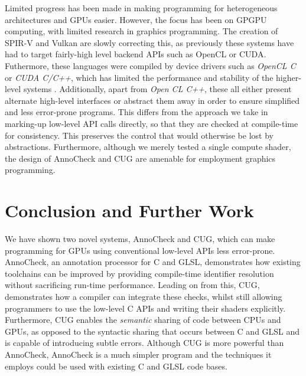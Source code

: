 \documentclass[a4paper,12pt,twoside,openright]{report}
\begin{document}
Limited progress has been made in making programming for heterogeneous
architectures and GPUs easier. However, the focus has been on GPGPU computing,
with limited research in graphics programming. The creation of SPIR-V and
Vulkan are slowly correcting this, as previously these systems have had to
target fairly-high level backend APIs such as OpenCL or CUDA. Futhermore, these
languages were compiled by device drivers such as \textit{OpenCL C} or
\textit{CUDA C/C++}, which has limited the performance and stability of the
higher-level systems \cite{GLFuzz}. Additionally, apart from \textit{Open CL
C++}, these all either present alternate high-level interfaces or abstract them
away in order to ensure simplified and less error-prone programs. This differs
from the approach we take in marking-up low-level API calls directly, so that
they are checked at compile-time for consistency. This preserves the control
that would otherwise be lost by abstractions. Furthermore, although we merely
tested a single compute shader, the design of AnnoCheck and CUG are amenable
for employment graphics programming.

\chapter{Conclusion and Further Work}

\label{chp:conclusion_and_further_work}



We have shown two novel systems, AnnoCheck and CUG, which can make programming
for GPUs using conventional low-level APIs less error-prone. AnnoCheck, an
annotation processor for C and GLSL, demonstrates how existing toolchains can
be improved by providing compile-time identifier resolution without sacrificing
run-time performance. Leading on from this, CUG, demonstrates how a compiler
can integrate these checks, whilst still allowing programmers to use the
low-level C APIs and writing their shaders explicitly. Furthermore, CUG enables
the \textit{semantic} sharing of code between CPUs and GPUs, as opposed to the
syntactic sharing that occurs between C and GLSL and is capable of introducing
subtle errors. Although CUG is more powerful than AnnoCheck, AnnoCheck is a
much simpler program and the techniques it employs could be used with existing
C and GLSL code bases.
\end{document}
